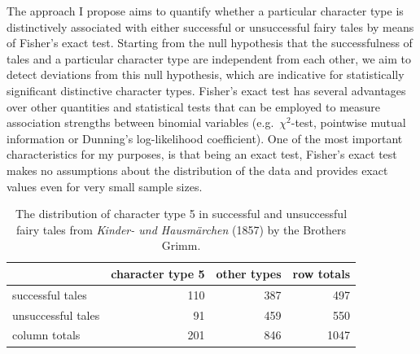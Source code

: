 The approach I propose aims to quantify whether a particular character type is distinctively associated with either successful or unsuccessful fairy tales by means of Fisher's exact test\autocite{fisher:1922}. Starting from the null hypothesis that the successfulness of tales and a particular character type are independent from each other, we aim to detect deviations from this null hypothesis, which are indicative for statistically significant distinctive character types. Fisher's exact test has several advantages over other quantities and statistical tests that can be employed to measure association strengths between binomial variables (e.g.\ $\chi^2$-test, pointwise mutual information\autocite{church:1990} or Dunning's log-likelihood coefficient\autocite{dunning:1993}). One of the most important characteristics for my purposes, is that being an exact test, Fisher's exact test makes no assumptions about the distribution of the data and provides exact values even for very small sample sizes. 

\begin{table}
\centering
\begin{tabular}{lrrr}
\toprule
                   & character type 5 & other types & row totals \\ \midrule
successful tales   & 110    & 387         & 497        \\
unsuccessful tales & 91     & 459         & 550        \\
column totals      & 201    & 846         & 1047       \\
\bottomrule
\end{tabular}
\caption{The distribution of character type 5 in successful and unsuccessful fairy tales from \emph{Kinder- und Hausmärchen} (1857) by the Brothers Grimm.}
\label{tab:fisher-example}
\end{table}

